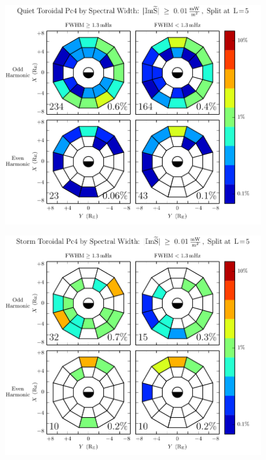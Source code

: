 \begin{figure}[!htb]
    \centering
    \includegraphics[width=\textwidth]{figures/fwhm_rate_t_calm.pdf}
    \caption[Toroidal Pc4 Rate by Compressional Coupling: Dst$\geq \SI{-30}{\nT}$]{
      \todo{$\cdots$}
    }
    \label{fig_fwhm_rate_t_calm}
\end{figure}

\begin{figure}[!htb]
    \centering
    \includegraphics[width=\textwidth]{figures/fwhm_rate_t_storm.pdf}
    \caption[Toroidal Pc4 Rate by Compressional Coupling: Dst$< \SI{-30}{\nT}$]{
      \todo{$\cdots$}
    }
    \label{fig_fwhm_rate_t_storm}
\end{figure}

